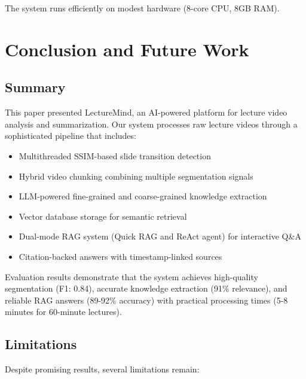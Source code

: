 \documentclass[12pt,a4paper]{article}
\begin{document}
The system runs efficiently on modest hardware (8-core CPU, 8GB RAM).

\newpage

\section{Conclusion and Future Work}
\label{sec:conclusion}

\subsection{Summary}

This paper presented LectureMind, an AI-powered platform for lecture video analysis and summarization. Our system processes raw lecture videos through a sophisticated pipeline that includes:

\begin{itemize}
    \item Multithreaded SSIM-based slide transition detection
    \item Hybrid video chunking combining multiple segmentation signals
    \item LLM-powered fine-grained and coarse-grained knowledge extraction
    \item Vector database storage for semantic retrieval
    \item Dual-mode RAG system (Quick RAG and ReAct agent) for interactive Q\&A
    \item Citation-backed answers with timestamp-linked sources
\end{itemize}

Evaluation results demonstrate that the system achieves high-quality segmentation (F1: 0.84), accurate knowledge extraction (91\% relevance), and reliable RAG answers (89-92\% accuracy) with practical processing times (5-8 minutes for 60-minute lectures).

\subsection{Limitations}

Despite promising results, several limitations remain:
\end{document}
